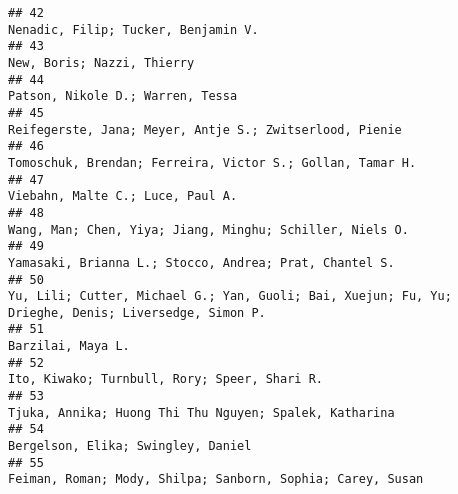 \documentclass[
  english,
  man]{apa6}
\begin{document}
\begin{verbatim}
## 42                                                                                                                                                       Nenadic, Filip; Tucker, Benjamin V.
## 43                                                                                                                                                                New, Boris; Nazzi, Thierry
## 44                                                                                                                                                          Patson, Nikole D.; Warren, Tessa
## 45                                                                                                                                   Reifegerste, Jana; Meyer, Antje S.; Zwitserlood, Pienie
## 46                                                                                                                                 Tomoschuk, Brendan; Ferreira, Victor S.; Gollan, Tamar H.
## 47                                                                                                                                                          Viebahn, Malte C.; Luce, Paul A.
## 48                                                                                                                                  Wang, Man; Chen, Yiya; Jiang, Minghu; Schiller, Niels O.
## 49                                                                                                                                    Yamasaki, Brianna L.; Stocco, Andrea; Prat, Chantel S.
## 50                                                                                       Yu, Lili; Cutter, Michael G.; Yan, Guoli; Bai, Xuejun; Fu, Yu; Drieghe, Denis; Liversedge, Simon P.
## 51                                                                                                                                                                         Barzilai, Maya L.
## 52                                                                                                                                              Ito, Kiwako; Turnbull, Rory; Speer, Shari R.
## 53                                                                                                                                    Tjuka, Annika; Huong Thi Thu Nguyen; Spalek, Katharina
## 54                                                                                                                                                        Bergelson, Elika; Swingley, Daniel
## 55                                                                                                                                Feiman, Roman; Mody, Shilpa; Sanborn, Sophia; Carey, Susan

\end{verbatim}
\end{document}
